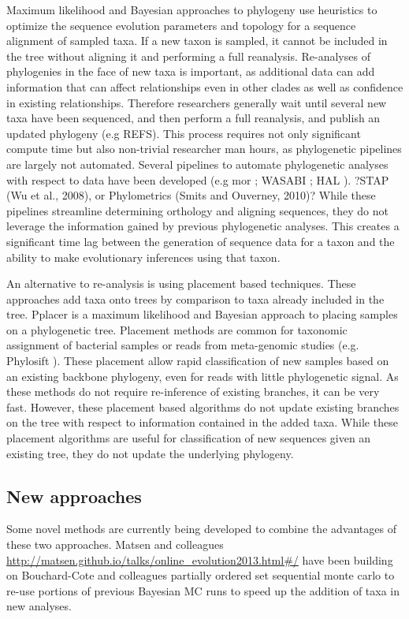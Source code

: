 \documentclass[10pt]{article}
\begin{document}
Maximum likelihood and Bayesian approaches to phylogeny use heuristics to optimize the sequence evolution parameters and topology for a sequence alignment of sampled taxa. If a new taxon is sampled, it cannot be included in the tree without aligning it and performing a full reanalysis.  Re-analyses of phylogenies in the face of new taxa is important, as additional data can add information that can affect relationships even in other clades as well as confidence in existing relationships. Therefore researchers generally wait until several new taxa have been sequenced, and then perform a full reanalysis, and publish an updated phylogeny (e.g REFS). This process requires not only significant compute time but also non-trivial researcher man hours, as phylogenetic pipelines are largely not automated. Several pipelines to automate phylogenetic analyses with respect to data have been developed (e.g mor \cite{hibbett_automated_2005}; WASABI \cite{kauff_WASABI:_2007}; HAL \cite{robbertse_hal:_2011}). ?STAP (Wu et al., 2008), or Phylometrics (Smits and Ouverney, 2010)? While these pipelines streamline determining orthology and aligning sequences, they do not leverage the information gained by previous phylogenetic analyses. This creates a significant time lag between the generation of sequence data for a taxon and the ability to make evolutionary inferences using that taxon.

An alternative to re-analysis is using placement based techniques. These approaches add taxa onto trees by comparison to taxa already included in the tree. 
Pplacer \cite{matsen_pplacer:_2010} is a maximum likelihood and Bayesian approach to placing samples on a phylogenetic tree. Placement methods are common for taxonomic assignment of bacterial samples or reads from meta-genomic studies (e.g. Phylosift \cite{darling_phylosift:_2014}). These placement allow rapid classification of new samples based on an existing backbone phylogeny, even for reads with little phylogenetic signal. As these methods do not require re-inference of existing branches, it can be very fast. However, these placement based algorithms do not update existing branches on the tree with respect to information contained in the added taxa. While these placement algorithms are useful for classification of new sequences given an existing tree, they do not update the underlying phylogeny.

\subsection*{New approaches}
Some novel methods are currently being developed to combine the advantages of these two approaches. Matsen and colleagues \url{http://matsen.github.io/talks/online_evolution2013.html#/} have been building on Bouchard-Cote and colleagues partially ordered set sequential monte carlo \cite{bouchard-cote_phylogenetic_2012} to re-use portions of previous Bayesian MC runs to speed up the addition of taxa in new analyses.
\end{document}

